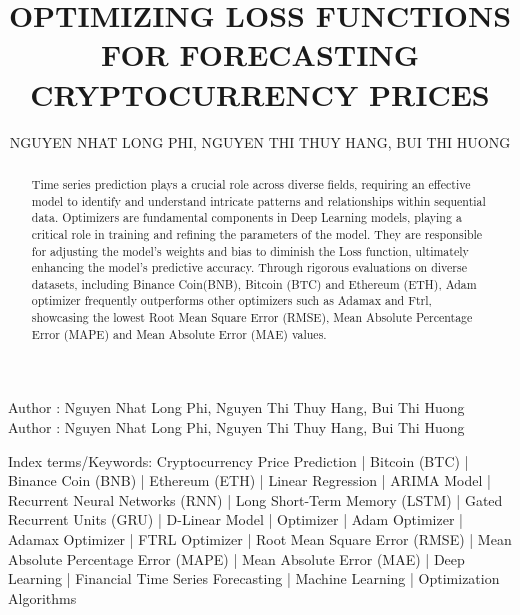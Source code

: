 \documentclass{ieeeojies}
\begin{document}
\title{OPTIMIZING LOSS FUNCTIONS FOR FORECASTING CRYPTOCURRENCY PRICES}

\author{\uppercase{Nguyen Nhat Long Phi},
\uppercase{Nguyen Thi Thuy Hang, Bui Thi Huong}}

\address[1]{Faculty of Information Systems, University of Information Technology, (e-mail: 21522454@gm.uit.edu.vn)}
\address[2]{Faculty of Information Systems, University of Information Technology, (e-mail: 21522042@gm.uit.edu.vn)}
\address[3]{Faculty of Information Systems, University of Information Technology, (e-mail: 21522130@gm.uit.edu.vn)}

\markboth
{Author \headeretal: Nguyen Nhat Long Phi, Nguyen Thi Thuy Hang, Bui Thi Huong}
{Author \headeretal: Nguyen Nhat Long Phi, Nguyen Thi Thuy Hang, Bui Thi Huong}

\begin{abstract}
Time series prediction plays a crucial role across diverse fields, requiring an effective model to identify and understand intricate patterns and relationships within sequential data. Optimizers are fundamental components in Deep Learning models, playing a critical role in training and refining the parameters of the model. They are responsible for adjusting the model’s weights and bias to diminish the Loss function, ultimately enhancing the model’s predictive accuracy. Through rigorous evaluations on diverse datasets, including Binance Coin(BNB), Bitcoin (BTC) and Ethereum (ETH), Adam optimizer frequently outperforms other optimizers such as Adamax and Ftrl, showcasing the lowest Root Mean Square Error (RMSE), Mean Absolute Percentage Error (MAPE) and Mean Absolute Error (MAE) values.
\end{abstract}

\begin{keywords}
Index terms/Keywords: Cryptocurrency Price Prediction | Bitcoin (BTC) | Binance Coin (BNB) | Ethereum (ETH) | Linear Regression | ARIMA Model | Recurrent Neural Networks (RNN) | Long Short-Term Memory (LSTM) | Gated Recurrent Units (GRU) | D-Linear Model | Optimizer | Adam Optimizer | Adamax Optimizer | FTRL Optimizer | Root Mean Square Error (RMSE) | Mean Absolute Percentage Error (MAPE) | Mean Absolute Error (MAE) | Deep Learning | Financial Time Series Forecasting | Machine Learning | Optimization Algorithms
\end{keywords}


\maketitle
\end{document}
